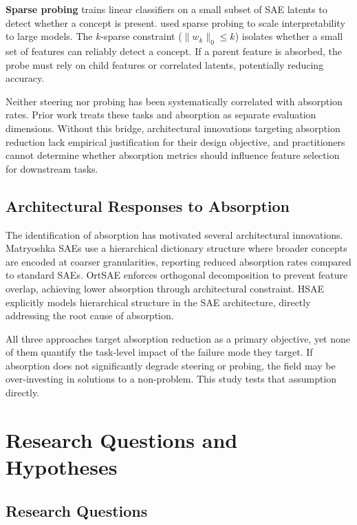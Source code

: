 \documentclass{article}
\begin{document}
\textbf{Sparse probing} trains linear classifiers on a small subset of SAE latents to detect whether a concept is present. \citet{templeton2024scaling} used sparse probing to scale interpretability to large models. The $k$-sparse constraint ($\|w_k\|_0 \leq k$) isolates whether a small set of features can reliably detect a concept. If a parent feature is absorbed, the probe must rely on child features or correlated latents, potentially reducing accuracy.

Neither steering nor probing has been systematically correlated with absorption rates. Prior work treats these tasks and absorption as separate evaluation dimensions. Without this bridge, architectural innovations targeting absorption reduction lack empirical justification for their design objective, and practitioners cannot determine whether absorption metrics should influence feature selection for downstream tasks.

\subsection{Architectural Responses to Absorption}

The identification of absorption has motivated several architectural innovations. Matryoshka SAEs \citep{bussmann2025matryoshka} use a hierarchical dictionary structure where broader concepts are encoded at coarser granularities, reporting reduced absorption rates compared to standard SAEs. OrtSAE \citep{korznikov2026ort} enforces orthogonal decomposition to prevent feature overlap, achieving lower absorption through architectural constraint. HSAE \citep{luo2026hsae} explicitly models hierarchical structure in the SAE architecture, directly addressing the root cause of absorption.

All three approaches target absorption reduction as a primary objective, yet none of them quantify the task-level impact of the failure mode they target. If absorption does not significantly degrade steering or probing, the field may be over-investing in solutions to a non-problem. This study tests that assumption directly.

\section{Research Questions and Hypotheses}
\label{sec:hypotheses}

\subsection{Research Questions}
\end{document}
